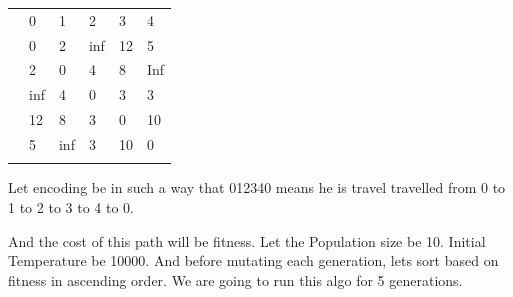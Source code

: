 \documentclass[12pt]{article}
\renewcommand{\_}{\kern-1.5pt\textunderscore\kern-1.5pt}
\begin{document}
\begin{table}[H]
 			\centering
\begin{tabular}{p{0.88in}p{0.88in}p{0.88in}p{0.88in}p{0.88in}p{0.88in}}
\hline
\multicolumn{1}{p{0.88in}}{} & 
\multicolumn{1}{p{0.88in}}{0} & 
\multicolumn{1}{p{0.88in}}{1} & 
\multicolumn{1}{p{0.88in}}{2} & 
\multicolumn{1}{p{0.88in}}{3} & 
\multicolumn{1}{p{0.88in}}{4} \\
\hhline{------}
\multicolumn{1}{p{0.88in}}{0} & 
\multicolumn{1}{|p{0.88in}}{0} & 
\multicolumn{1}{|p{0.88in}}{2} & 
\multicolumn{1}{|p{0.88in}}{inf} & 
\multicolumn{1}{|p{0.88in}}{12} & 
\multicolumn{1}{|p{0.88in}|}{5} \\
\hhline{~-----}
\multicolumn{1}{p{0.88in}}{1} & 
\multicolumn{1}{|p{0.88in}}{2} & 
\multicolumn{1}{|p{0.88in}}{0} & 
\multicolumn{1}{|p{0.88in}}{4} & 
\multicolumn{1}{|p{0.88in}}{8} & 
\multicolumn{1}{|p{0.88in}|}{Inf} \\
\hhline{~-----}
\multicolumn{1}{p{0.88in}}{2} & 
\multicolumn{1}{|p{0.88in}}{inf} & 
\multicolumn{1}{|p{0.88in}}{4} & 
\multicolumn{1}{|p{0.88in}}{0} & 
\multicolumn{1}{|p{0.88in}}{3} & 
\multicolumn{1}{|p{0.88in}|}{3} \\
\hhline{~-----}
\multicolumn{1}{p{0.88in}}{3} & 
\multicolumn{1}{|p{0.88in}}{12} & 
\multicolumn{1}{|p{0.88in}}{8} & 
\multicolumn{1}{|p{0.88in}}{3} & 
\multicolumn{1}{|p{0.88in}}{0} & 
\multicolumn{1}{|p{0.88in}|}{10} \\
\hhline{~-----}
\multicolumn{1}{p{0.88in}}{4} & 
\multicolumn{1}{|p{0.88in}}{5} & 
\multicolumn{1}{|p{0.88in}}{inf} & 
\multicolumn{1}{|p{0.88in}}{3} & 
\multicolumn{1}{|p{0.88in}}{10} & 
\multicolumn{1}{|p{0.88in}|}{0} \\
\hhline{~-----}

\end{tabular}
 \end{table}




\vspace{\baselineskip}
Let encoding be in such a way that 012340 means he is travel travelled from 0 to 1 to 2 to 3 to 4 to 0. \par

And the cost of this path will be fitness. Let the Population size be 10. Initial Temperature be 10000. And before mutating each generation, lets sort based on fitness in ascending order. We are going to run this algo for 5 generations.\par
\end{document}
